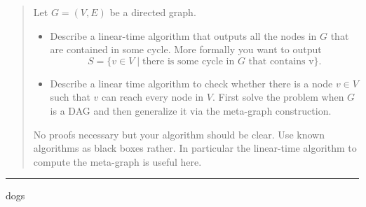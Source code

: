 \documentclass[11pt]{article}
\begin{document}

\begin{quote}
Let $G=(V,E)$ be a directed graph.
  \begin{itemize}
  \item Describe a linear-time algorithm that outputs all the nodes in
    $G$ that are contained in some cycle. More formally you want to
    output
    $$S = \{ v \in V \mid \text{there is some cycle in $G$ that
      contains v}\}.$$
  \item Describe a linear time algorithm to check whether there is a
    node $v \in V$ such that $v$ can reach every node in $V$. First
    solve the problem when $G$ is a DAG and then generalize it via the
    meta-graph construction.
  \end{itemize}
  No proofs necessary but your algorithm should be clear. Use known
  algorithms as black boxes rather. In particular the linear-time algorithm to
  compute the meta-graph is useful here.
\end{quote}
\hrule



\begin{solution}
    dogs
\end{solution}

\end{document}
